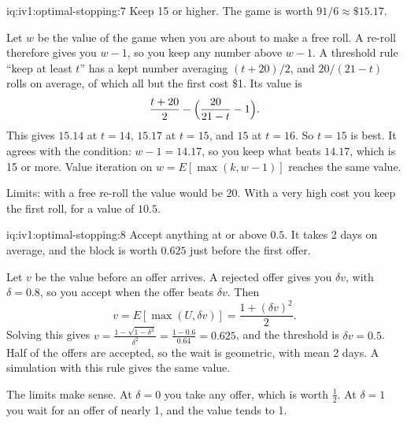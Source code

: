 \begin{solution}{iq:iv1:optimal-stopping:7}
Keep 15 or higher. The game is worth $91/6 \approx \$15.17$.

Let $w$ be the value of the game when you are about to make a free roll. A re-roll therefore gives you $w - 1$, so you keep any number above $w - 1$. A threshold rule ``keep at least $t$'' has a kept number averaging $(t + 20)/2$, and $20/(21 - t)$ rolls on average, of which all but the first cost \$1. Its value is
\[
\frac{t + 20}{2} - \Bigl(\frac{20}{21 - t} - 1\Bigr).
\]
This gives $15.14$ at $t = 14$, $15.17$ at $t = 15$, and $15$ at $t = 16$. So $t = 15$ is best. It agrees with the condition: $w - 1 = 14.17$, so you keep what beats $14.17$, which is 15 or more. Value iteration on $w = E[\max(k, w - 1)]$ reaches the same value.

Limits: with a free re-roll the value would be 20. With a very high cost you keep the first roll, for a value of $10.5$.

\end{solution}

\begin{solution}{iq:iv1:optimal-stopping:8}
Accept anything at or above $0.5$. It takes 2 days on average, and the block is worth $0.625$ just before the first offer.

Let $v$ be the value before an offer arrives. A rejected offer gives you $\delta v$, with $\delta = 0.8$, so you accept when the offer beats $\delta v$. Then
\[
v = E[\max(U, \delta v)] = \frac{1 + (\delta v)^2}{2}.
\]
Solving this gives $v = \frac{1 - \sqrt{1 - \delta^2}}{\delta^2} = \frac{1 - 0.6}{0.64} = 0.625$, and the threshold is $\delta v = 0.5$. Half of the offers are accepted, so the wait is geometric, with mean 2 days. A simulation with this rule gives the same value.

The limits make sense. At $\delta = 0$ you take any offer, which is worth $\tfrac12$. At $\delta = 1$ you wait for an offer of nearly 1, and the value tends to 1.

\end{solution}

